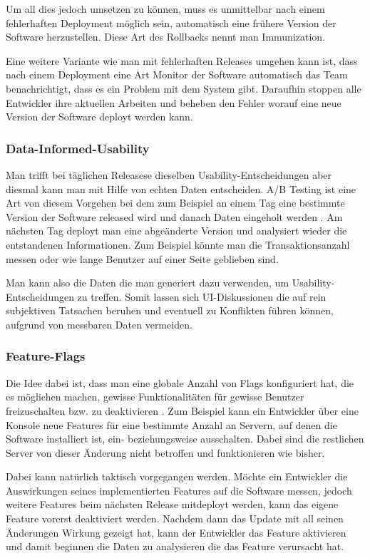 Um all dies jedoch umsetzen zu können, muss es unmittelbar nach einem fehlerhaften Deployment möglich sein, automatisch eine frühere Version der Software herzustellen. Diese Art des Rollbacks nennt man Immunization.

Eine weitere Variante wie man mit fehlerhaften Releases umgehen kann ist, dass nach einem Deployment eine Art Monitor der Software automatisch das Team benachrichtigt, dass es ein Problem mit dem System gibt. Daraufhin stoppen alle Entwickler ihre aktuellen Arbeiten und beheben den Fehler worauf eine neue Version der Software deployt werden kann.

\subsubsection{Data-Informed-Usability}
Man trifft bei täglichen Releasese dieselben Usability-Entscheidungen aber diesmal kann man mit Hilfe von echten Daten entscheiden. A/B Testing ist eine Art von diesem Vorgehen bei dem zum Beispiel an einem Tag eine bestimmte Version der Software released wird und danach Daten eingeholt werden \cite{webanalytics2009}. Am nächsten Tag deployt man eine abgeänderte Version und analysiert wieder die entstandenen Informationen. Zum Beispiel könnte man die Transaktionsanzahl messen oder wie lange Benutzer auf einer Seite geblieben sind. 

Man kann also die Daten die man generiert dazu verwenden, um Usability-Entscheidungen zu treffen. Somit lassen sich UI-Diskussionen die auf rein subjektiven Tatsachen beruhen und eventuell zu Konflikten führen können, aufgrund von messbaren Daten vermeiden.

\subsubsection{Feature-Flags}
\label{minisec:featureflags}
Die Idee dabei ist, dass man eine globale Anzahl von Flags konfiguriert hat, die es möglichen machen, gewisse Funktionalitäten für gewisse Benutzer freizuschalten bzw. zu deaktivieren \cite{weboperations2010}. Zum Beispiel kann ein Entwickler über eine Konsole neue Features für eine bestimmte Anzahl an Servern, auf denen die Software installiert ist, ein- beziehungsweise ausschalten. Dabei sind die restlichen Server von dieser Änderung nicht betroffen und funktionieren wie bisher.

Dabei kann natürlich taktisch vorgegangen werden. Möchte ein Entwickler die Auswirkungen seines implementierten Features auf die Software messen, jedoch weitere Features beim nächsten Release mitdeployt werden, kann das eigene Feature vorerst deaktiviert werden. Nachdem dann das Update mit all seinen Änderungen Wirkung gezeigt hat, kann der Entwickler das Feature aktivieren und damit beginnen die Daten zu analysieren die das Feature verursacht hat. 

